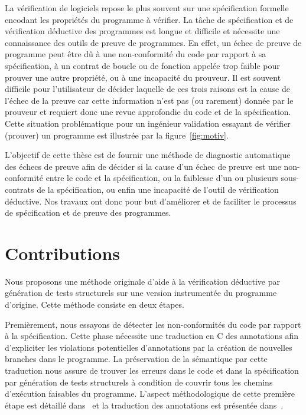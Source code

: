 La vérification de logiciels repose le plus souvent sur une spécification
formelle encodant les propriétés du programme à vérifier.
La tâche de spécification et de vérification déductive des programmes est
longue et difficile et nécessite une connaissance des outils de preuve de
programmes.
En effet, un échec de preuve de programme peut être dû à une
non-conformité du code par rapport à sa spécification, à un
contrat de boucle ou de fonction appelée trop faible pour prouver une autre
propriété, ou à une incapacité du prouveur.
Il est souvent difficile pour l'utilisateur de décider laquelle de ces trois
raisons est la cause de l'échec de la preuve car cette information n'est pas
(ou rarement) donnée par le prouveur et requiert donc une revue approfondie
du code et de la spécification.
Cette situation problématique pour un ingénieur validation essayant de vérifier
(prouver) un programme est illustrée par la figure~\ref{fig:motiv}.

L'objectif de cette thèse est de fournir une méthode de diagnostic automatique
des échecs de preuve afin de décider si la cause d'un échec de preuve est une
non-conformité entre le code et la spécification, ou la faiblesse d'un ou
plusieurs sous-contrats de la spécification, ou enfin une incapacité de l'outil
de vérification déductive.
Nos travaux ont donc pour but d'améliorer et de faciliter le processus de
spécification et de preuve des programmes.


\section{Contributions}
\label{sec:contrib}


Nous proposons une méthode originale d'aide à la vérification déductive par
génération de tests structurels sur une version instrumentée du programme
d'origine.
Cette méthode consiste en deux étapes.

Premièrement, nous essayons de détecter les non-conformités du code par
rapport à la spécification.
Cette phase nécessite une traduction en C des annotations \acsl afin
d'expliciter les violations potentielles d'annotations par la création de
nouvelles branches dans le programme.
La préservation de la sémantique par cette traduction nous assure de trouver
les erreurs dans le code et dans la spécification par génération de tests
structurels à condition de couvrir tous les chemins d'exécution faisables du
programme.
L'aspect méthodologique de cette première étape est détaillé
dans~\cite{Petiot/TAP14} et la traduction des annotations est présentée
dans~\cite{Petiot/SCAM14}.

